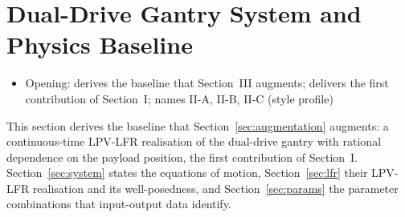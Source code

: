 \section{Dual-Drive Gantry System and Physics Baseline}
\ifdraft
\begin{itemize}
\item Opening: derives the baseline that Section~III augments; delivers the first contribution of Section~I; names II-A, II-B, II-C (style profile)
\end{itemize}
\fi

This section derives the baseline that Section~\ref{sec:augmentation}
augments: a continuous-time LPV-LFR realisation of the dual-drive gantry with
rational dependence on the payload position, the first contribution of
Section~I.
Section~\ref{sec:system} states the equations of motion,
Section~\ref{sec:lfr} their LPV-LFR realisation and its well-posedness, and
Section~\ref{sec:params} the parameter combinations that input-output data
identify.

